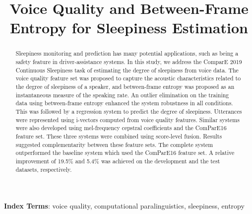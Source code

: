 \documentclass[a4paper]{article}
\title{Voice Quality and Between-Frame Entropy for Sleepiness Estimation}
\newcommand{\Soo}[1]{\textcolor{magenta}{[Soo: #1]}}
\begin{document}
\maketitle
% 
\begin{abstract}
Sleepiness monitoring and prediction has many potential applications, such as being a safety feature in driver-assistance systems. In this study, we address the ComparE 2019 Continuous Sleepiness task of estimating the degree of sleepiness from voice data. 
The voice quality feature set was proposed to capture the acoustic characteristics related to the degree of sleepiness of a speaker, and between-frame entropy was proposed as an instantaneous measure of the speaking rate. An outlier elimination on the training data using between-frame entropy enhanced the system robustness in all conditions. This was followed by a regression system to predict the degree of sleepiness. Utterances were represented using i-vectors computed from voice quality features. Similar systems were also developed using mel-frequency cepstral coefficients and the ComParE16 feature set. These three systems were combined using score-level fusion. Results suggested complementarity between these feature sets. The complete system outperformed the baseline system which used the ComParE16 feature set. A relative improvement of 19.5\% and  5.4\% was achieved on the development and the test datasets, respectively. 
\end{abstract}
\vspace{2mm}

\noindent\textbf{Index Terms}:  voice quality, computational paralinguistics, sleepiness, entropy  %





\end{document}
